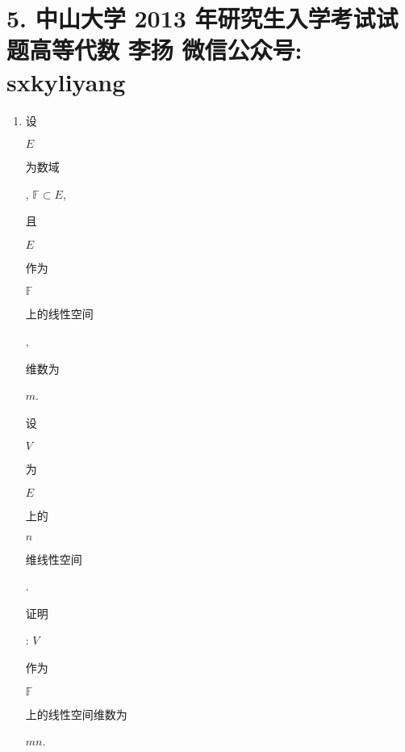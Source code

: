 \documentclass[10pt]{article}
\begin{document}
\section{5. 中山大学 2013 年研究生入学考试试题高等代数 
 李扬 
 微信公众号: sxkyliyang}
\begin{enumerate}
  \item \begin{CJK}{UTF8}{mj}设\end{CJK} $E$ \begin{CJK}{UTF8}{mj}为数域\end{CJK}, $\mathbb{F} \subset E$, \begin{CJK}{UTF8}{mj}且\end{CJK} $E$ \begin{CJK}{UTF8}{mj}作为\end{CJK} $\mathbb{F}$ \begin{CJK}{UTF8}{mj}上的线性空间\end{CJK}, \begin{CJK}{UTF8}{mj}维数为\end{CJK} $m$. \begin{CJK}{UTF8}{mj}设\end{CJK} $V$ \begin{CJK}{UTF8}{mj}为\end{CJK} $E$ \begin{CJK}{UTF8}{mj}上的\end{CJK} $n$ \begin{CJK}{UTF8}{mj}维线性空间\end{CJK}. \begin{CJK}{UTF8}{mj}证明\end{CJK}: $V$ \begin{CJK}{UTF8}{mj}作为\end{CJK} $\mathbb{F}$ \begin{CJK}{UTF8}{mj}上的线性空间维数为\end{CJK} $m n$.


\end{enumerate}
\end{document}
